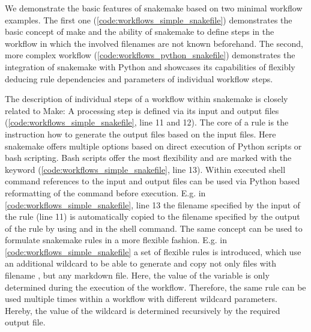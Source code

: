 We demonstrate the basic features of snakemake based on two minimal workflow examples. The first one (\cref{code:workflows_simple_snakefile}) demonstrates the basic concept of make and the ability of snakemake to define steps in the workflow in which the involved filenames are not known beforehand. The second, more complex workflow (\cref{code:workflows_python_snakefile}) demonstrates the integration of snakemake with Python and showcases its capabilities of flexibly deducing rule dependencies and parameters of individual workflow steps.

The description of individual steps of a workflow within snakemake is closely related to Make: A processing step is defined via its input and output files (\cref{code:workflows_simple_snakefile}, line 11 and 12). The core of a rule is the instruction how to generate the output files based on the input files. Here snakemake offers multiple options based on direct execution of Python scripts or bash scripting. Bash scripts offer the most flexibility and are marked with the  keyword (\cref{code:workflows_simple_snakefile}, line 13). Within executed shell command references to the input and output files can be used via Python based reformatting of the command before execution. E.g. in \cref{code:workflows_simple_snakefile}, line 13 the filename specified by the input of the rule  (line 11) is automatically copied to the filename specified by the output of the rule by using  and  in the shell command. The same concept can be used to formulate snakemake rules in a more flexible fashion. E.g. in \cref{code:workflows_simple_snakefile} a set of flexible rules is introduced, which use an additional wildcard  to be able to generate and copy not only files with filename , but any markdown file. Here, the value of the variable  is only determined during the execution of the workflow. Therefore, the same rule can be used multiple times within a workflow with different wildcard parameters. Hereby, the value of the wildcard is determined recursively by the required output file.

